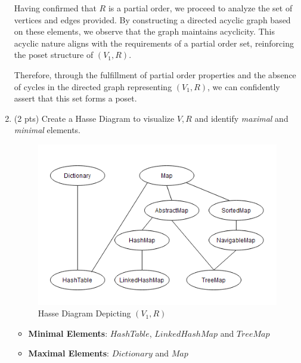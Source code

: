 \documentclass[12pt]{article}
\begin{document}
\begin{spacing}{1.5}
\begin{enumerate}
\begin{itemize}
		      \end{itemize} 
		      		      
		      Having confirmed that $R$ is a partial order, we proceed to analyze the set of vertices and edges provided. By constructing a directed acyclic graph based on these elements, we observe that the graph maintains acyclicity. This acyclic nature aligns with the requirements of a partial order set, reinforcing the poset structure of $(V_1, R)$. 
		      		                  
		      Therefore, through the fulfillment of partial order properties and the absence of cycles in the directed graph representing $(V_1, R)$, we can confidently assert that this set forms a poset.       
		      		      		              
		\item (2 pts) Create a Hasse Diagram to visualize $V, R$ and identify \textit{maximal} and \textit{minimal} elements.
		      		      
		      \begin{figure}[htp]
		      	\centering
		      	\includegraphics{static/HasseDiagram_6_3_1.png}
		      	\caption{Hasse Diagram Depicting $(V_1,R)$}
		      	\label{fig:figure}
		      \end{figure}
		      		           
		      \begin{itemize}
		      	\item \textbf{Minimal Elements}: $HashTable$, $LinkedHashMap$ and $TreeMap$
		      	\item \textbf{Maximal Elements}: $Dictionary$ and $Map$
		      \end{itemize}
		      		      		      

\end{enumerate}
\end{spacing}
\end{document}
